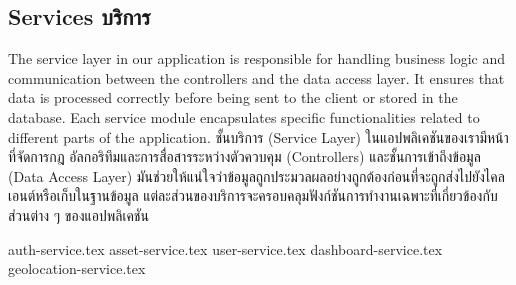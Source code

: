 \subsection{\ifenglish Services \else บริการ \fi}

\ifenglish
The service layer in our application is responsible for handling business logic and communication between the controllers and the data access layer. It ensures that data is processed correctly before being sent to the client or stored in the database. Each service module encapsulates specific functionalities related to different parts of the application.
\else
ชั้นบริการ (Service Layer) ในแอปพลิเคชันของเรามีหน้าที่จัดการกฎ อัลกอริทึมและการสื่อสารระหว่างตัวควบคุม (Controllers) และชั้นการเข้าถึงข้อมูล (Data Access Layer) มันช่วยให้แน่ใจว่าข้อมูลถูกประมวลผลอย่างถูกต้องก่อนที่จะถูกส่งไปยังไคลเอนต์หรือเก็บในฐานข้อมูล แต่ละส่วนของบริการจะครอบคลุมฟังก์ชันการทำงานเฉพาะที่เกี่ยวข้องกับส่วนต่าง ๆ ของแอปพลิเคชัน
\fi

\newcommand{\serviceDir}{chapters/approach/backend/services}
{auth-service.tex}
{asset-service.tex}
{user-service.tex}
{dashboard-service.tex}
{geolocation-service.tex}